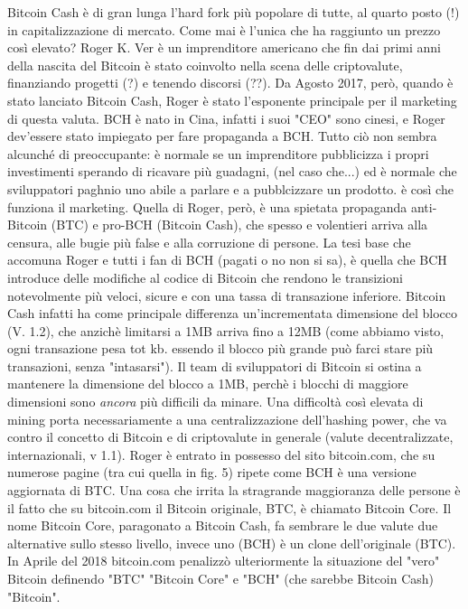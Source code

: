 \documentclass {article}
\begin{document}
Bitcoin Cash è di gran lunga l'hard fork più popolare di tutte, al quarto posto (!) in capitalizzazione di mercato. Come mai è l'unica che ha raggiunto un prezzo così elevato?
Roger K. Ver è un imprenditore americano che fin dai primi anni della nascita del Bitcoin è stato coinvolto nella scena delle criptovalute, finanziando progetti (?) e tenendo discorsi (??).
Da Agosto 2017, però, quando è stato lanciato Bitcoin Cash, Roger è stato l'esponente principale per il marketing di questa valuta. BCH è nato in Cina, infatti i suoi "CEO" sono cinesi, e Roger dev'essere stato impiegato per fare propaganda a BCH.
Tutto ciò non sembra alcunché di preoccupante: è normale se un imprenditore pubblicizza i propri investimenti sperando di ricavare più guadagni, (nel caso che...) ed è normale che sviluppatori paghnio uno abile a parlare e a pubblcizzare un prodotto.
è così che funziona il marketing.
Quella di Roger, però, è una spietata propaganda anti-Bitcoin (BTC) e pro-BCH (Bitcoin Cash), che spesso e volentieri arriva alla censura, alle bugie più false e alla corruzione di persone.
La tesi base che accomuna Roger e tutti i fan di BCH (pagati o no non si sa), è quella che BCH introduce delle modifiche al codice di Bitcoin che rendono le transizioni notevolmente più veloci, sicure e con una tassa di transazione inferiore. Bitcoin Cash infatti ha come principale differenza un'incrementata dimensione del blocco (V. 1.2), che anzichè limitarsi a 1MB arriva fino a 12MB (come abbiamo visto, ogni transazione pesa tot kb. essendo il blocco più grande può farci stare più transazioni, senza "intasarsi").
Il team di sviluppatori di Bitcoin si ostina a mantenere la dimensione del blocco a 1MB, perchè i blocchi di maggiore dimensioni sono \emph{ancora} più difficili da minare.
Una difficoltà così elevata di mining porta necessariamente a una centralizzazione dell'hashing power, che va contro il concetto di Bitcoin e di criptovalute in generale (valute decentralizzate, internazionali, v 1.1).
Roger è entrato in possesso del sito bitcoin.com, che su numerose pagine (tra cui quella in fig. 5) ripete come BCH è una versione aggiornata di BTC. Una cosa che irrita la stragrande maggioranza delle persone è il fatto che su bitcoin.com il Bitcoin originale, BTC, è chiamato Bitcoin Core.
Il nome Bitcoin Core, paragonato a Bitcoin Cash, fa sembrare le due valute due alternative sullo stesso livello, invece uno (BCH) è un clone dell'originale (BTC).
In Aprile del 2018 bitcoin.com penalizzò ulteriormente la situazione del "vero" Bitcoin definendo "BTC" "Bitcoin Core" e "BCH" (che sarebbe Bitcoin Cash) "Bitcoin".
\end{document}
